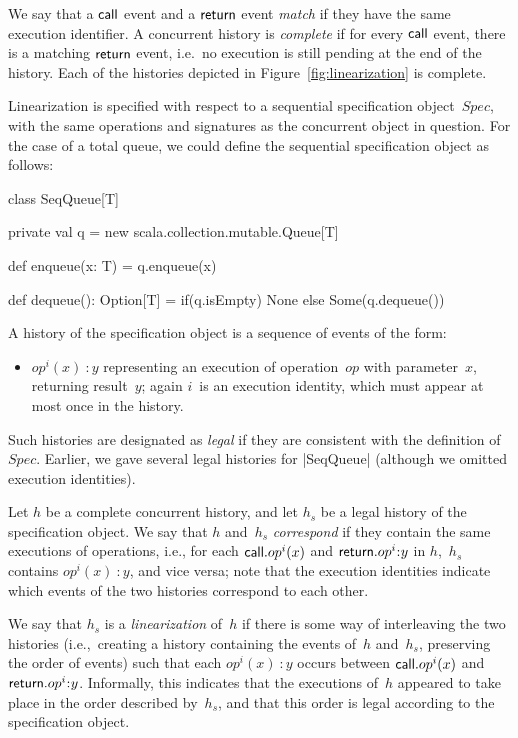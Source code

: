 We say that a $\mathsf{call}$ event and a $\mathsf{return}$ event \emph{match} if they have the same execution identifier.  A concurrent history is
\emph{complete} if for every $\mathsf{call}$ event, there is a
matching $\mathsf{return}$ 
event, i.e.~no execution is still pending at the end of the history.  Each of
the histories depicted in Figure~\ref{fig:linearization} is complete.

Linearization is specified with respect to a sequential specification
object~$Spec$, with the same operations
and signatures as the concurrent object in question.  For the case of a total
queue, we could define the sequential specification object as follows:
%
\begin{scala}
class SeqQueue[T]{
  private val q = new scala.collection.mutable.Queue[T]

  def enqueue(x: T) = q.enqueue(x)

  def dequeue(): Option[T] = if(q.isEmpty) None else Some(q.dequeue())
}
\end{scala}
%
A history of the specification object is a sequence
of events of the form:
%
\begin{itemize}
\item $op^i(x)\::y$ representing an execution of operation~$op$ with
  parameter~$x$, returning result~$y$; again $i$~is an execution identity,
  which must appear at most once in the history.
\end{itemize}
%
Such histories are designated as \emph{legal}
if they are consistent with the definition of~$Spec$.  Earlier, we gave
several legal histories for |SeqQueue| (although we omitted execution
identities).

Let $h$ be a complete concurrent history, and let $h_s$ be a legal history of
the specification object.  We say that $h$ and~$h_s$
\emph{correspond} if they contain the same
executions of operations, i.e., for each $\mathsf{call}.op^i(x)$ and
$\return.op^i\::y$ in $h$,\, $h_s$ contains $op^i(x)\::y$, and vice versa;
note that the execution identities indicate which events of the two histories
correspond to each other.  

We say that $h_s$ is a \emph{linearization} of~$h$ if
there is some way of interleaving the two histories (i.e.,~creating a history
containing the events of~$h$ and~$h_s$, preserving the order of events) such
that each $op^i(x)\::y$ occurs between $\mathsf{call}.op^i(x)$ and $\return.op^i\::y$.
Informally, this indicates that the executions of~$h$ appeared to take place
in the order described by~$h_s$, and that this order is legal according to the
specification object.

